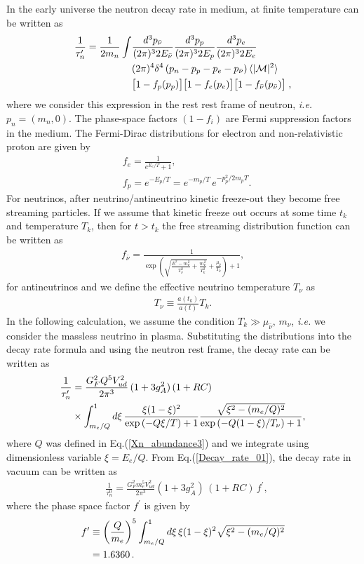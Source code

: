 In the early universe the neutron decay rate in medium, at finite temperature can be written as~\cite{Kuznetsova:2010pi}
\begin{align}
\frac{1}{\tau^\prime_n}=\frac{1}{2m_n}\int&\frac{d^3p_{\bar{\nu}}}{(2\pi)^32E_{\bar{\nu}}}\frac{d^3p_p}{(2\pi)^32E_p}\frac{d^3p_e}{(2\pi)^32E_e}\notag\\
&(2\pi)^4\delta^4\left(p_n-p_p-p_e-p_{\bar{\nu}}\right)\langle|\mathcal{M}|^2\rangle\notag\\
&\big[1-f_p(p_p)\big]\big[1-f_e(p_e)\big]\big[1-f_{\bar{\nu}}(p_{\bar{\nu}})\big]\;,
\end{align}
where we consider this expression in the rest rest frame of neutron, {\it i.e.\/} $p_n=(m_n,0)$. The phase-space factors $(1-f_i)$ are Fermi suppression factors in the medium. The Fermi-Dirac distributions for electron and non-relativistic proton are given by
\begin{align}
&f_e=\frac{1}{e^{E_e/T}+1},\\
&f_p=e^{-E_p/T}=e^{-m_p/T}\,e^{-p_p^2/2m_pT}.
\end{align}
For neutrinos, after neutrino/antineutrino kinetic freeze-out they become free streaming particles. If we assume that kinetic freeze out occurs at some time $t_k$ and temperature $T_k$, then for $t>t_k$ the free streaming distribution function can be written as~\cite{Birrell:2012gg}
\begin{align}
f_{\bar{\nu}}=\frac{1}{\exp{\left(\sqrt{\frac{E^2-m_\nu^2}{T_\nu^2}+\frac{m^2_\nu}{T^2_k}}+\frac{\mu_{\bar{\nu}}}{T_k}\right)+1}},
\end{align}
for antineutrinos and we define the effective neutrino temperature $T_\nu$ as
\begin{align}
T_\nu\equiv\frac{a(t_k)}{a(t)}T_k.
\end{align}
In the following calculation, we assume the condition $T_k\gg\mu_{\bar{\nu}},\,m_\nu$, {\it i.e.\/} we consider the massless neutrino in plasma. Substituting the distributions into the decay rate formula and using the neutron rest frame, the decay rate can be written as 
\begin{align}
\label{Decay_rate_01}
\frac{1}{\tau_n^\prime}&=\frac{G^2_FQ^5V^2_{ud}}{2\pi^3}\,(1+3g^2_A)\,(1+RC)\\
&\times\int^1_{m_e/Q}d\xi\,\frac{\xi(1-\xi)^2}{\exp\left(-Q\xi/{T}\right)+1}\frac{\sqrt{\xi^2-(m_e/Q)^2}}{\exp\left(-Q(1-\xi)/T_\nu\right)+1},\notag
\end{align} 
where $Q$ was defined in Eq.\;(\ref{Xn_abundance3}) and we integrate using dimensionless variable $\xi=E_e/Q$. From Eq.(\ref{Decay_rate_01}), the decay rate in vacuum can be written as
\begin{align}
&\frac{1}{\tau_n^0}=\frac{G^2_Fm_e^5V^2_{ud}}{2\pi^3}(1+3g^2_A)\,(1+RC)\,f^\prime,
\end{align}
where the phase space factor $f^\prime$ is given by
\begin{align}
f^\prime&\equiv\left(\frac{Q}{m_e}\right)^5\int^1_{m_e/Q}d\xi\,{\xi(1-\xi)^2}\sqrt{\xi^2-(m_e/Q)^2}
\notag\\&=1.6360\,.
\end{align}

